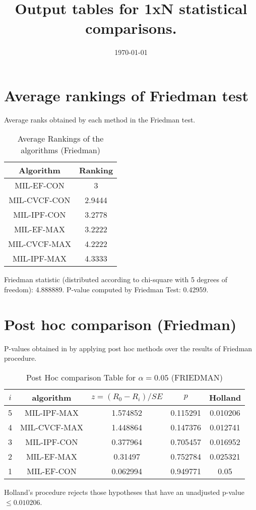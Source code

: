 \documentclass[a4paper,10pt]{article}
\title{Output tables for 1xN statistical comparisons.}
\author{}
\date{\today}
\begin{document}
\begin{landscape}
\pagestyle{empty}
\maketitle
\thispagestyle{empty}

\section{Average rankings of Friedman test}


Average ranks obtained by each method in the Friedman test.

\begin{table}[!htp]
\centering
\begin{tabular}{|c|c|}\hline
Algorithm&Ranking\\\hline
MIL-EF-CON&3\\MIL-CVCF-CON&2.9444\\MIL-IPF-CON&3.2778\\MIL-EF-MAX&3.2222\\MIL-CVCF-MAX&4.2222\\MIL-IPF-MAX&4.3333\\\hline\end{tabular}
\caption{Average Rankings of the algorithms (Friedman)}
\end{table}

Friedman statistic (distributed according to chi-square with 5 degrees of freedom): 4.888889. \newline P-value computed by Friedman Test: 0.42959.\newline


\newpage

\section{Post hoc comparison (Friedman)}


P-values obtained in by applying post hoc methods over the results of Friedman procedure.

\begin{table}[!htp]
\centering\footnotesize
\begin{tabular}{ccccc}
$i$&algorithm&$z=(R_0 - R_i)/SE$&$p$&Holland\\
\hline5&MIL-IPF-MAX&1.574852&0.115291&0.010206\\4&MIL-CVCF-MAX&1.448864&0.147376&0.012741\\3&MIL-IPF-CON&0.377964&0.705457&0.016952\\2&MIL-EF-MAX&0.31497&0.752784&0.025321\\1&MIL-EF-CON&0.062994&0.949771&0.05\\\hline
\end{tabular}
\caption{Post Hoc comparison Table for $\alpha=0.05$ (FRIEDMAN)}
\end{table}Holland's procedure rejects those hypotheses that have an unadjusted p-value $\le0.010206$.



\end{landscape}
\end{document}

